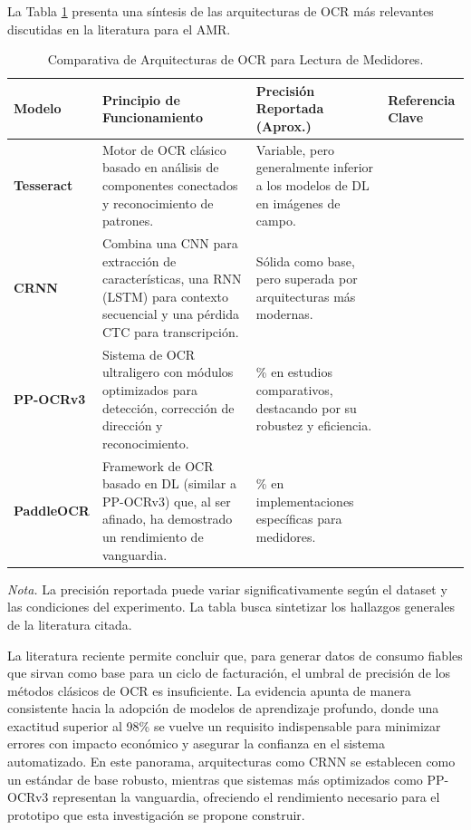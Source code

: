 La Tabla \ref{tab:ocr_comparison} presenta una síntesis de las arquitecturas de OCR más relevantes discutidas en la literatura para el AMR.

\begin{table}[H]
    \centering
    \caption{Comparativa de Arquitecturas de OCR para Lectura de Medidores.}
    \label{tab:ocr_comparison}
    \begin{singlespace}
    \begin{tabularx}{\textwidth}{>{\bfseries}l >{\raggedright\arraybackslash}X >{\raggedright\arraybackslash}X >{\raggedright\arraybackslash}X}
        \toprule
        \textbf{Modelo} & \textbf{Principio de Funcionamiento} & \textbf{Precisión Reportada (Aprox.)} & \textbf{Referencia Clave} \\
        \midrule
        \textbf{Tesseract} & Motor de OCR clásico basado en análisis de componentes conectados y reconocimiento de patrones. & Variable, pero generalmente inferior a los modelos de DL en imágenes de campo. & \parencite{Maheshwari2023Automatic} \\
        \addlinespace
        \textbf{CRNN} & Combina una CNN para extracción de características, una RNN (LSTM) para contexto secuencial y una pérdida CTC para transcripción. & Sólida como base, pero superada por arquitecturas más modernas. & \parencite{Carvalho2023, Shen2023} \\
        \addlinespace
        \textbf{PP-OCRv3} & Sistema de OCR ultraligero con módulos optimizados para detección, corrección de dirección y reconocimiento. & 93\% en estudios comparativos, destacando por su robustez y eficiencia. & \parencite{Nguyen2025Water} \\
        \addlinespace
        \textbf{PaddleOCR} & Framework de OCR basado en DL (similar a PP-OCRv3) que, al ser afinado, ha demostrado un rendimiento de vanguardia. & 96.92\% en implementaciones específicas para medidores. & \parencite{Khan2024LowCost} \\
        \bottomrule
    \end{tabularx}
    \end{singlespace}
    \vspace{1ex} 
    \parbox{\textwidth}{
        \singlespace
        \textit{Nota.} La precisión reportada puede variar significativamente según el dataset y las condiciones del experimento. La tabla busca sintetizar los hallazgos generales de la literatura citada.
    }
\end{table}

La literatura reciente permite concluir que, para generar datos de consumo fiables que sirvan como base para un ciclo de facturación, el umbral de precisión de los métodos clásicos de OCR es insuficiente. La evidencia apunta de manera consistente hacia la adopción de modelos de aprendizaje profundo, donde una exactitud superior al 98\% se vuelve un requisito indispensable para minimizar errores con impacto económico y asegurar la confianza en el sistema automatizado. En este panorama, arquitecturas como CRNN se establecen como un estándar de base robusto, mientras que sistemas más optimizados como PP-OCRv3 representan la vanguardia, ofreciendo el rendimiento necesario para el prototipo que esta investigación se propone construir.

